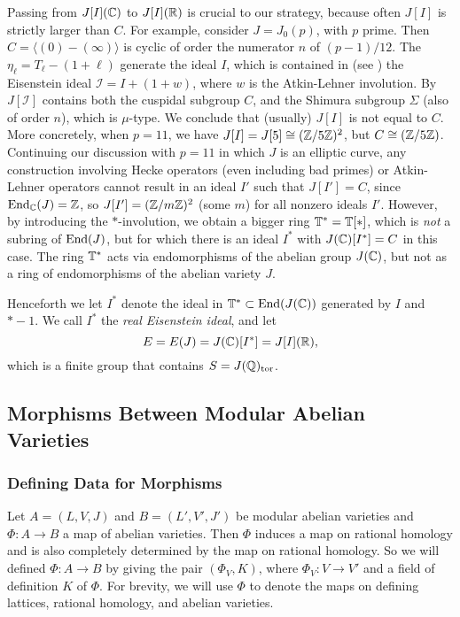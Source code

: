 \documentclass{article}
\begin{document}
Passing from $J[I](\mathbb{C})$ to $J[I](\mathbb{R})$ is crucial to our strategy,
because often $J[I]$ is strictly larger than $C$.  For example,
consider $J=J_0(p)$, with $p$ prime.  Then $C=\langle (0)-(\infty)
\rangle$ is cyclic of order the numerator $n$ of $(p-1)/12$.  The
$\eta_{\ell} = T_{\ell}-(1+\ell)$ generate the ideal $I$, which is
contained in (see \cite[pg.~95]{mazur:eisenstein}) the Eisenstein ideal
$\mathcal{I} = I + (1+w)$, where $w$ is the Atkin-Lehner involution.
By \cite[Prop.~11.1 on pg.~98 and Prop.~11.7 on pg.~100]{mazur:eisenstein}
$J[\mathcal{I}]$ contains both the cuspidal subgroup $C$, and the
Shimura subgroup $\Sigma$ (also of order $n$), which is $\mu$-type.
We conclude that (usually) $J[I]$ is not equal to $C$.  More
concretely, when $p=11$, we have $J[I]= J[5]\cong (\mathbb{Z}/5\mathbb{Z})^2$, but
$C\cong (\mathbb{Z}/5\mathbb{Z})$.  Continuing our discussion with $p=11$ in which $J$
is an elliptic curve, any construction involving Hecke operators (even
including bad primes) or Atkin-Lehner operators cannot result in an
ideal $I'$ such that $J[I'] =C$, since $\operatorname{End}_{\mathbb{C}}(J)=\mathbb{Z}$, so
$J[I']=(\mathbb{Z}/m\mathbb{Z})^2$ (some $m$) for all nonzero ideals $I'$.  However,
by introducing the $*$-involution, we obtain a bigger ring $\mathbb{T}^* =
\mathbb{T}[*]$, which is {\em not} a subring of $\operatorname{End}(J)$, but for which there
is an ideal $I^*$ with $J(\mathbb{C})[I^*] = C$ in this case.  The ring $\mathbb{T}^*$
acts via endomorphisms of the abelian group $J(\mathbb{C})$, but not as a ring
of endomorphisms of the abelian variety $J$.

Henceforth we let $I^*$ denote the ideal in $\mathbb{T}^* \subset \operatorname{End}(J(\mathbb{C}))$
generated by $I$ and $*-1$.
We call $I^*$ the {\em real Eisenstein ideal}, and let
$$
  E = E(J) = J(\mathbb{C})[I^*] = J[I](\mathbb{R}),
$$
which is a finite group that contains $S = J(\mathbb{Q})_{\operatorname{tor}}$.


\subsection{Morphisms Between Modular Abelian Varieties}



\subsubsection{Defining Data for Morphisms}

Let $A=(L, V, J)$ and $B=(L', V', J')$ be modular abelian varieties and
$\Phi:A\to B$ a map of abelian varieties. Then $\Phi$ induces a map on rational
homology and is also completely determined by the map on rational homology.
So we will defined $\Phi:A\to B$ by giving the pair $(\Phi_V, K)$, where
$\Phi_V:V\to V'$ and a field of definition $K$ of $\Phi$. For brevity, we will
use $\Phi$ to denote the maps on defining lattices, rational homology, and
abelian varieties.
\end{document}
